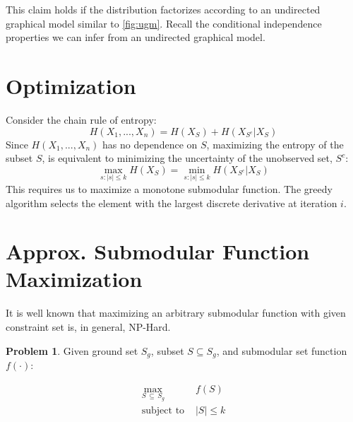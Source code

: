 \documentclass[twoside]{article}
\theoremstyle{definition}
\newtheorem{problem}{Problem}
\begin{document}
This claim holds if the distribution factorizes according to an
undirected graphical model similar to \ref{fig:ugm}. Recall the conditional
independence properties we can infer from an undirected graphical
model.

\section{Optimization}

Consider the chain rule of entropy:
$$H(X_1, ..., X_n) = H(X_S) + H(X_{S^c} | X_S)$$
Since $H(X_1, ..., X_n)$ has no dependence on $S$, maximizing the
entropy of the subset $S$, is equivalent to minimizing the
uncertainty of the unobserved set, $S^c$:
$$\max_{s: |s| \leq k} H(X_S) = \min_{s: |s| \leq k} H(X_{S^c} |
X_S)$$
This requires us to maximize a monotone submodular function. The
greedy algorithm selects the element with the largest discrete
derivative at iteration $i$.



\section{Approx. Submodular Function Maximization}


It is well known that maximizing an arbitrary submodular function with
given constraint set is, in general, NP-Hard. %

\begin{problem}
Given ground set $S_g$, subset $S \subseteq S_g$, and submodular set function $f(\cdot)$:

\begin{equation*}
  \begin{split}
    \max_{S \, \subseteq \, S_g} &f(S)\\
    \text{subject to } &|S| \leq k
  \end{split}
\end{equation*}

\end{problem}

%
\end{document}
